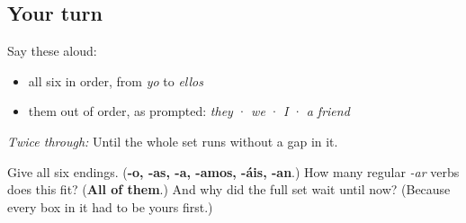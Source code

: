 \subsection*{Your turn}
Say these aloud:

\begin{itemize}
\raggedright
  \item all six in order, from \emph{yo} to \emph{ellos}
  \item them out of order, as prompted: \emph{they} · \emph{we} · \emph{I} · \emph{a friend}
\end{itemize}

\emph{Twice through:} Until the whole set runs without a gap in it.

\begin{tcolorbox}[breakable,colback=teal!4,colframe=teal!35!black,title={Before you move on}]
Give all six endings. (\textbf{-o, -as, -a, -amos, -áis, -an}.) How many regular \emph{-ar} verbs does this fit? (\textbf{All of them}.) And why did the full set wait until now? (Because every box in it had to be yours first.)
\end{tcolorbox}
